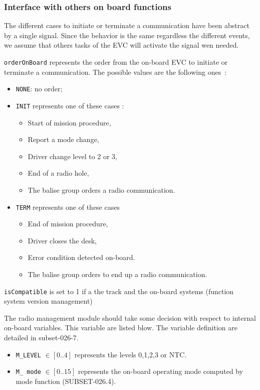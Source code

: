 \subsubsection{Interface with others on board functions}
The different cases to initiate or terminate a communication have been abstract
by a single signal. Since the behavior is the same regardless the different
events, we assume that others tasks of the EVC will activate the signal wen
needed.

\begin{description}
\item \verb+orderOnBoard+ represents the order from the on-board EVC to initiate
or terminate a communication. The possible values are the following ones~: 
  \begin{itemize}
  \item \verb+NONE+:  no order;
  \item \verb+INIT+ represents one of these cases :
	\begin{itemize}
	\item Start of mission procedure,
	\item Report a mode change,
	\item Driver change level to 2 or 3,
	\item End of a radio hole,
	\item The balise group orders a radio communication.
	\end{itemize}
  \item \verb+TERM+ represents one of these cases
	\begin{itemize}
	\item End of mission procedure, 
	\item Driver closes the desk,
	\item Error condition detected on-board.
	\item The balise group orders to end up a radio communication.
	\end{itemize}
  \end{itemize}
\item \verb+isCompatible+ is set to 1 if a the track and the on-board systems
(function system version management)
\end{description}

The radio management module should take some decision with respect to internal
on-board variables.
This variable are listed blow. The variable definition
are detailed in subset-026-7.
\begin{itemize}
\item \verb+M_LEVEL+ $\in [0..4]$ represents the levels 0,1,2,3 or NTC.
\item \verb+M_ mode+ $\in[0..15]$ represents the on-board operating mode
computed by mode function (SUBSET-026.4). 
\end{itemize}

